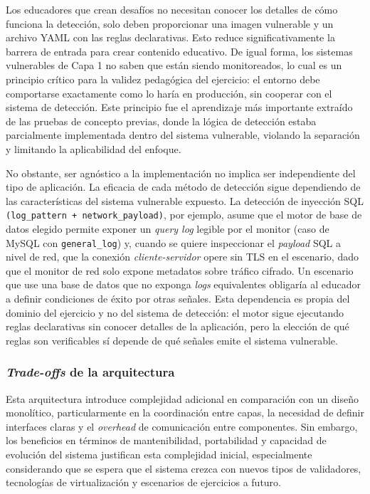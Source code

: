 Los educadores que crean desafíos no necesitan conocer los detalles de cómo
funciona la detección, solo deben proporcionar una imagen vulnerable y un
archivo YAML con las reglas declarativas. Esto reduce significativamente la
barrera de entrada para crear contenido educativo. De igual forma, los sistemas
vulnerables de Capa 1 no saben que están siendo monitoreados, lo cual es un
principio crítico para la validez pedagógica del ejercicio: el entorno debe
comportarse exactamente como lo haría en producción, sin cooperar con el sistema
de detección. Este principio fue el aprendizaje más importante extraído de las
pruebas de concepto previas, donde la lógica de detección estaba parcialmente
implementada dentro del sistema vulnerable, violando la separación y limitando
la aplicabilidad del enfoque.

No obstante, ser agnóstico a la implementación no implica ser independiente del
tipo de aplicación. La eficacia de cada método de detección sigue dependiendo de
las características del sistema vulnerable expuesto. La detección de inyección
SQL \texttt{(log\_pattern + network\_payload)}, por ejemplo, asume que el motor
de base de datos elegido permite exponer un \textit{query log} legible por el
monitor (caso de MySQL con \texttt{general\_log}) y, cuando se quiere
inspeccionar el \textit{payload} SQL a nivel de red, que la conexión
\textit{cliente-servidor} opere sin TLS en el escenario, dado que el monitor de
red solo expone metadatos sobre tráfico cifrado. Un escenario que use una base
de datos que no exponga \textit{logs} equivalentes obligaría al educador a
definir condiciones de éxito por otras señales. Esta dependencia es propia del
dominio
del ejercicio y no del sistema de detección: el motor sigue ejecutando reglas
declarativas sin conocer detalles de la aplicación, pero la elección de qué
reglas son verificables sí depende de qué señales emite el sistema vulnerable.

\subsubsection*{\textit{Trade-offs} de la arquitectura}

Esta arquitectura introduce complejidad adicional en comparación con un diseño
monolítico, particularmente en la coordinación entre capas, la necesidad de
definir interfaces claras y el \textit{overhead} de comunicación entre
componentes. Sin embargo, los beneficios en términos de mantenibilidad,
portabilidad y capacidad de evolución del sistema justifican esta complejidad
inicial, especialmente considerando que se espera que el sistema crezca con
nuevos tipos de validadores, tecnologías de virtualización y escenarios de
ejercicios a futuro.

